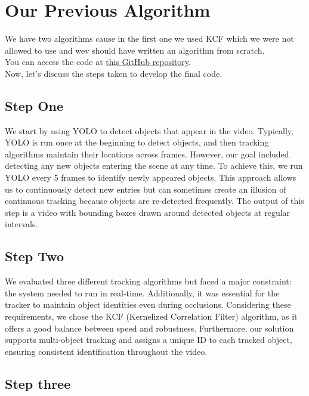 \documentclass[a4paper,12pt]{article}
\begin{document}
\section{Our Previous Algorithm}

We have two algorithms cause in the first one we used KCF which we were not allowed to use and wev should have written an algorithm from scratch. \\
You can access the code at \href{https://github.com/amirali83/Signal_Project_2025/tree/main/Codes/Ours/main}{this GitHub repository}. \\
Now, let's discuss the steps taken to develop the final code.

\subsection{Step One}

We start by using YOLO to detect objects that appear in the video.
Typically, YOLO is run once at the beginning to detect objects, and then tracking algorithms maintain their locations 
across frames. However, our goal included detecting any new objects entering the scene at any time. 
To achieve this, we run YOLO every 5 frames to identify newly appeared objects. This approach allows us to continuously 
detect new entries but can sometimes create an illusion of continuous tracking because objects are re-detected frequently. 
The output of this step is a video with bounding boxes drawn around detected objects at regular intervals.


\subsection{Step Two}

We evaluated three different tracking algorithms but faced a major constraint: the system needed to run in real-time. 
Additionally, it was essential for the tracker to maintain object identities even during occlusions. 
Considering these requirements, we chose the KCF (Kernelized Correlation Filter) algorithm, as it offers a good balance between speed and robustness. 
Furthermore, our solution supports multi-object tracking and assigns a unique ID to each tracked object, ensuring consistent identification throughout the video.

\subsection{Step three}
\end{document}
